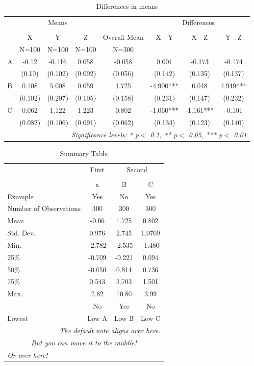 \begin{table}[!ht]
  \centering
  \caption{Differences in means}
  \label{table:differencesinmeans}
\begin{tabular}{lccccccc}
  \toprule
  \toprule
   & \multicolumn{3}{c}{Means} & \multicolumn{1}{c}{} & \multicolumn{3}{c}{Differences} \\
  \cmidrule(lr){2-4}\cmidrule(lr){6-8} \\
   & X & Y & Z & Overall Mean & X - Y & X - Z & Y - Z\\
   & N=100 & N=100 & N=100 & N=300 &  &  & \\
  \midrule
  A & -0.12 & -0.116 & 0.058 & -0.058 & 0.001 & -0.173 & -0.174 \\
   & (0.10) & (0.102) & (0.092) & (0.056) & (0.142) & (0.135) & (0.137) \\
  B & 0.108 & 5.008 & 0.059 & 1.725 & -4.900*** & 0.048 & 4.949*** \\
   & (0.102) & (0.207) & (0.105) & (0.158) & (0.231) & (0.147) & (0.232) \\
  C & 0.062 & 1.122 & 1.223 & 0.802 & -1.060*** & -1.161*** & -0.101 \\
   & (0.082) & (0.106) & (0.091) & (0.062) & (0.134) & (0.123) & (0.140) \\
  \bottomrule
  \multicolumn{8}{r}{{\small \textit{Significance levels: * p$<$ 0.1, ** p$<$ 0.05, *** p$<$ 0.01}}}\\
\end{tabular}
\end{table}
\begin{table}[!ht]
  \centering
\begin{tabular}{lccc}
  \toprule
  \toprule
   & \multicolumn{1}{c}{First} & \multicolumn{2}{c}{Second} \\
  \cmidrule(lr){2-2}\cmidrule(lr){3-4} \\
   & a & B & C\\
  Example & Yes & No & Yes\\
  \midrule
  Number of Observations & 300 & 300 & 300 \\
  Mean & -0.06 & 1.725 & 0.802 \\
  Std. Dev. & 0.976 & 2.745 & 1.0709 \\
  Min. & -2.782 & -2.535 & -1.480 \\
  25\% & -0.709 & -0.221 & 0.094 \\
  50\% & -0.050 & 0.814 & 0.736 \\
  75\% & 0.543 & 3.703 & 1.501 \\
  Max. & 2.82 & 10.80 & 3.99 \\
   & No & Yes & No\\
  \bottomrule
  Lowest & Low A & Low B & Low C\\
  \bottomrule
  \multicolumn{4}{r}{{\small \textit{The default note aligns over here.}}}\\
  \multicolumn{4}{c}{{\small \textit{But you can move it to the middle!}}}\\
  \multicolumn{4}{l}{{\small \textit{Or over here!}}}\\
\end{tabular}
  \caption{Summary Table}
  \label{table:summarytable}
\end{table}
